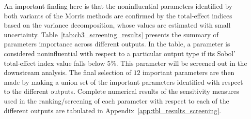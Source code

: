 An important finding here is that the noninfluential parameters identified by both variants of the Morris methods are confirmed by the total-effect indices based on the variance decomposition, whose values are estimated with small uncertainty.
Table~\ref{tab:ch3_screening_results} presents the summary of parameters importance across different outputs.
In the table, a parameter is considered noninfluential with respect to a particular output type if its Sobol' total-effect index value falls below $5\%$.
This parameter will be screened out in the downstream analysis.
The final selection of $12$ important parameters are then made by making a union set of the important parameters identified with respect to the different outputs.
Complete numerical results of the sensitivity measures used in the ranking/screening of each parameter with respect to each of the different outputs are tabulated in Appendix~\ref{app:tbl_results_screening}.
